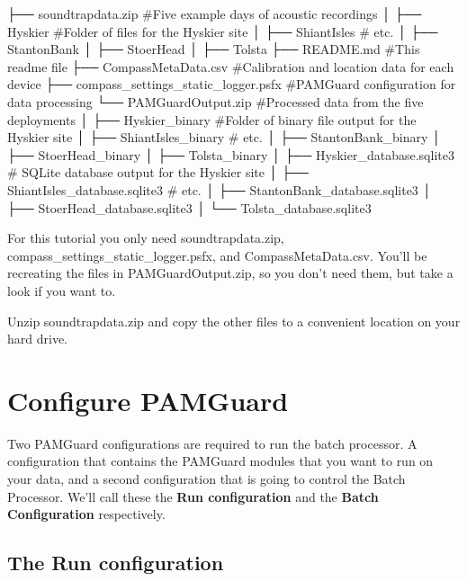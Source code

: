 \documentclass[
]{article}
\newenvironment{Shaded}{\begin{snugshade}}{\end{snugshade}}
\newcommand{\NormalTok}[1]{\textcolor[rgb]{0.00,0.23,0.31}{#1}}
\begin{document}
\begin{Shaded}
\begin{Highlighting}[]
\NormalTok{├── soundtrapdata.zip                  \#Five example days of acoustic recordings}
\NormalTok{│   ├── Hyskier                        \#Folder of files for the Hyskier site}
\NormalTok{│   ├── ShiantIsles                    \# etc.}
\NormalTok{│   ├── StantonBank}
\NormalTok{│   ├── StoerHead}
\NormalTok{│   ├── Tolsta}
\NormalTok{├── README.md                          \#This readme file}
\NormalTok{├── CompassMetaData.csv                \#Calibration and location data for each device}
\NormalTok{├── compass\_settings\_static\_logger.psfx \#PAMGuard configuration for data processing}
\NormalTok{└── PAMGuardOutput.zip                 \#Processed data from the five deployments}
\NormalTok{│   ├── Hyskier\_binary                 \#Folder of binary file output for the Hyskier site}
\NormalTok{│   ├── ShiantIsles\_binary             \# etc.}
\NormalTok{│   ├── StantonBank\_binary }
\NormalTok{│   ├── StoerHead\_binary }
\NormalTok{│   ├── Tolsta\_binary }
\NormalTok{│   ├── Hyskier\_database.sqlite3       \# SQLite database output for the Hyskier site}
\NormalTok{│   ├── ShiantIsles\_database.sqlite3   \# etc.}
\NormalTok{│   ├── StantonBank\_database.sqlite3 }
\NormalTok{│   ├── StoerHead\_database.sqlite3 }
\NormalTok{│   └── Tolsta\_database.sqlite3 }
\end{Highlighting}
\end{Shaded}

For this tutorial you only need soundtrapdata.zip,
compass\_settings\_static\_logger.psfx, and CompassMetaData.csv. You'll
be recreating the files in PAMGuardOutput.zip, so you don't need them,
but take a look if you want to.

Unzip soundtrapdata.zip and copy the other files to a convenient
location on your hard drive.

\section{Configure PAMGuard}\label{configure-pamguard}

Two PAMGuard configurations are required to run the batch processor. A
configuration that contains the PAMGuard modules that you want to run on
your data, and a second configuration that is going to control the Batch
Processor. We'll call these the \textbf{Run configuration} and the
\textbf{Batch Configuration} respectively.

\subsection{The Run configuration}\label{the-run-configuration}
\end{document}
